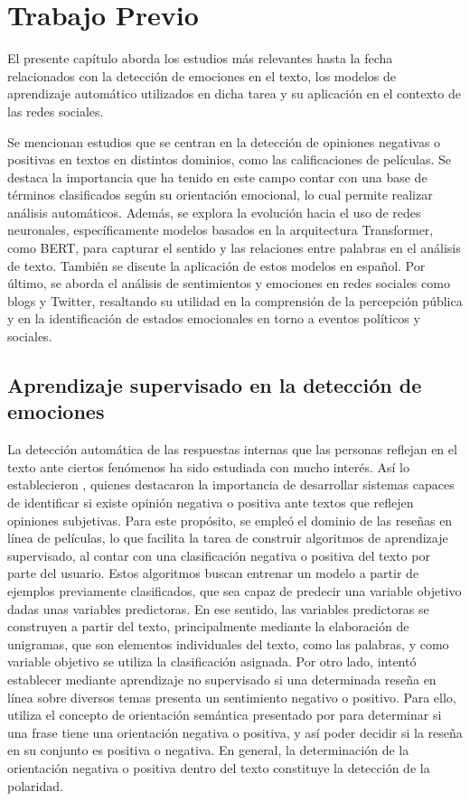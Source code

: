 \chapter{Trabajo Previo}


El presente capítulo aborda los estudios más relevantes hasta la fecha relacionados con la detección de emociones en el texto, los modelos de aprendizaje automático utilizados en dicha tarea y su aplicación en el contexto de las redes sociales.

Se mencionan estudios que se centran en la detección de opiniones negativas o positivas en textos en distintos dominios, como las calificaciones de películas. Se destaca la importancia que ha tenido en este campo contar con una base de términos clasificados según su orientación emocional, lo cual permite realizar análisis automáticos. Además, se explora la evolución hacia el uso de redes neuronales, específicamente modelos basados en la arquitectura Transformer, como BERT, para capturar el sentido y las relaciones entre palabras en el análisis de texto. También se discute la aplicación de estos modelos en español. Por último, se aborda el análisis de sentimientos y emociones en redes sociales como blogs y Twitter, resaltando su utilidad en la comprensión de la percepción pública y en la identificación de estados emocionales en torno a eventos políticos y sociales.


\section{Aprendizaje supervisado en la detección de emociones}



La detección automática de las respuestas internas que las personas reflejan en el texto ante ciertos fenómenos ha sido estudiada con mucho interés. Así lo establecieron \cite{pang2002thumbs}, quienes destacaron la importancia de desarrollar sistemas capaces de identificar si existe opinión negativa o positiva ante textos que reflejen opiniones subjetivas. Para este propósito, se empleó el dominio de las reseñas en línea de películas, lo que facilita la tarea de construir algoritmos de aprendizaje supervisado, al contar con una clasificación negativa o positiva del texto por parte del usuario. Estos algoritmos buscan entrenar un modelo a partir de ejemplos previamente clasificados, que sea capaz de predecir una variable objetivo dadas unas variables predictoras. En ese sentido, las variables predictoras se construyen a partir del texto, principalmente mediante la elaboración de unigramas, que son elementos individuales del texto, como las palabras, y como variable objetivo se utiliza la clasificación asignada. Por otro lado, \cite{turney2002thumbs} intentó establecer mediante aprendizaje no supervisado si una determinada reseña en línea sobre diversos temas presenta un sentimiento negativo o positivo. Para ello, utiliza el concepto de orientación semántica presentado por \cite{hatzivassiloglou1997predicting} para determinar si una frase tiene una orientación negativa o positiva, y así poder decidir si la reseña en su conjunto es positiva o negativa. En general, la determinación de la orientación negativa o positiva dentro del texto constituye la detección de la polaridad.

